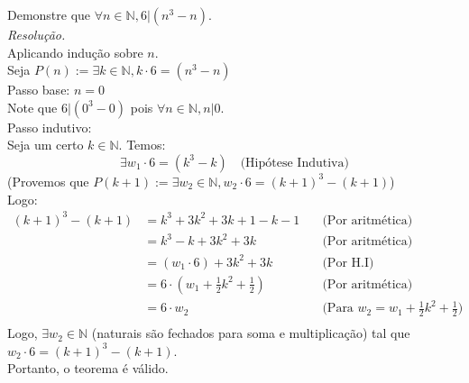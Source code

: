 Demonstre que $\forall n \in \mathbb{N}, 6 | (n^3 - n)$.\\
\emph{Resolução.}\\
Aplicando indução sobre $n$. \\
Seja $P(n) := \exists k \in \mathbb{N}, k \cdot 6 = (n^3 - n)$ \\
Passo base: $n = 0$ \\
Note que $6 | (0^3 - 0)$ pois $\forall n \in \mathbb{N}, n | 0$. \\
Passo indutivo: \\
Seja um certo $k \in \mathbb{N}$. Temos:
\begin{displaymath}
    \exists w_1 \cdot 6 = (k^3 - k) \quad \text{(Hipótese Indutiva)}
\end{displaymath}
(Provemos que $P(k + 1) := \exists w_2 \in \mathbb{N}, w_2 \cdot 6 = (k + 1)^3 - (k + 1)$) \\
Logo:
\begin{align*}
    (k + 1)^3 - (k + 1) & = k^3 + 3k^2 + 3k + 1 - k - 1                  & \quad \text{(Por aritmética)}                                  \\
                        & = k^3 - k + 3k^2 + 3k                          & \quad \text{(Por aritmética)}                                  \\
                        & = (w_1 \cdot 6) + 3k^2 + 3k                    & \quad \text{(Por H.I)}                                         \\
                        & = 6 \cdot (w_1 + \frac{1}{2}k^2 + \frac{1}{2}) & \quad \text{(Por aritmética)}                                  \\
                        & = 6 \cdot w_2                                  & \quad \text{(Para $w_2 = w_1 + \frac{1}{2}k^2 + \frac{1}{2}$)} \\
\end{align*}
Logo, $\exists w_2 \in \mathbb{N}$ (naturais são fechados para soma e multiplicação) tal que $w_2 \cdot 6 = (k + 1)^3 - (k + 1)$. \\
Portanto, o teorema é válido.